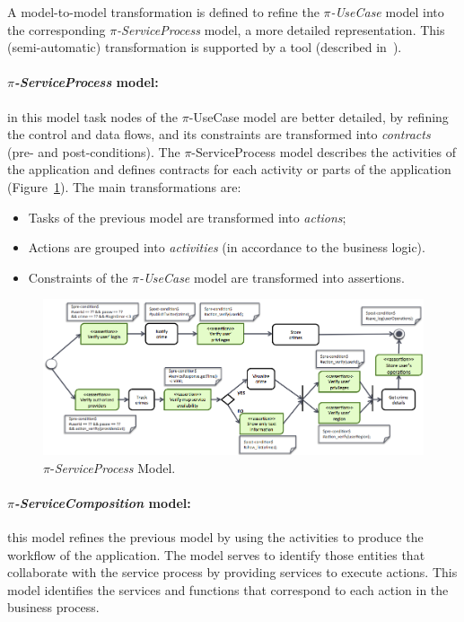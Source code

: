 A model-to-model transformation is defined to refine the \textit{$\pi$-UseCase} model into the
corresponding \textit{$\pi$-ServiceProcess} model, a more detailed representation. 
This (semi-automatic) transformation  is supported by a tool (described in~\cite{PlacidoThesis2012}).


\paragraph*{\textit{$\pi$-ServiceProcess} model:}
in this model task nodes of the $\pi$-UseCase model are better detailed, by refining the control and data flows, and its constraints are transformed into \textit{contracts} (pre- and post-conditions).
The $\pi$-ServiceProcess model describes the activities of the application and defines contracts for each activity or parts of the application (Figure~\ref{fig:piSP}). The main transformations are: 
\begin{itemize}
\item Tasks of the previous model are transformed into \textit{actions};
\item Actions are grouped into \textit{activities} (in accordance to the business logic).
\item Constraints of the \textit{$\pi$-UseCase} model are transformed into assertions.
\end{itemize}

\begin{figure}[t]
\centering
\includegraphics[width=1.05\textwidth]{figs/piServiceProcess}
\caption{$\pi$-\textit{ServiceProcess} Model.}
\label{fig:piSP}
\end{figure}

\paragraph*{\textit{$\pi$-ServiceComposition} model:} 
this model refines the previous model by using the activities to produce the workflow of the application.
The model serves to identify those entities that collaborate with the service process by providing services to execute actions. 
This model identifies the services and functions that correspond to each action in the business process.


